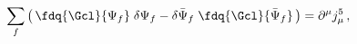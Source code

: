 \begin{equation}
\sum_f \left(\, \fdq{\Gcl}{\Psi_f} \; \delta \Psi_f -
              \delta \bar \Psi_f \; \fdq{\Gcl}{\bar\Psi_f}\,\right) =
\partial^\mu j_\mu^5\,, \label{chirWIclass}
\end{equation}

